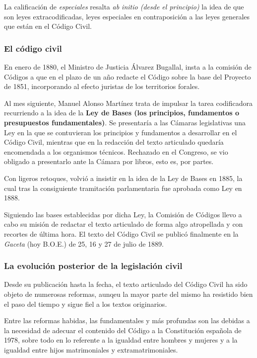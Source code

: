 \documentclass[a4paper,12pt]{report}
\begin{document}
La calificación de \emph{especiales} resalta \emph{ab initio (desde el principio)} la idea de que son
leyes extracodificadas, leyes especiales en contraposición a las leyes generales
que están en el Código Civil.

\subsubsection{El código civil}

En enero de 1880, el Ministro de Justicia Álvarez Bugallal, insta a la comisión
de Códigos a que en el plazo de un año redacte el Código sobre la base del
Proyecto de 1851, incorporando al efecto juristas de los territorios forales.

Al mes siguiente, Manuel Alonso Martínez trata de impulsar la tarea codificadora
recurriendo a la idea de la \textbf{Ley de Bases (los principios, fundamentos o
presupuestos fundamentales)}. Se presentaría a las Cámaras
legislativas una Ley en la que se contuvieran los principios y fundamentos a
desarrollar en el Código Civil, mientras que en la redacción del texto
articulado quedaría encomendada a los organismos técnicos. Rechazado en el
Congreso, se vio obligado a presentarlo ante la Cámara por libros, esto es, por
partes.

Con ligeros retoques, volvió a insistir en la idea de la Ley de Bases en 1885,
la cual tras la consiguiente tramitación parlamentaria fue aprobada como Ley en
1888.

Siguiendo las bases establecidas por dicha Ley, la Comisión de Códigos llevo a
cabo su misión de redactar el texto articulado de forma algo atropellada y
con recortes de última hora.  El texto del Código Civil se publicó finalmente en la \emph{Gaceta}
(hoy B.O.E.) de 25, 16 y 27 de julio de 1889.

\subsubsection{La evolución posterior de la legislación civil}

Desde su publicación hasta la fecha, el texto articulado del Código Civil ha
sido objeto de numerosas reformas, aunqeu la mayor parte del mismo ha resistido
bien el paso del tiempo y sigue fiel a los textos originarios.

Entre las reformas habidas, las fundamentales y más profundas son las debidas a
la necesidad de adecuar el contenido del Código a la Constitución española de
1978, sobre todo en lo referente a la igualdad entre hombres y mujeres y a la
igualdad entre hijos matrimoniales y extramatrimoniales.
\end{document}
